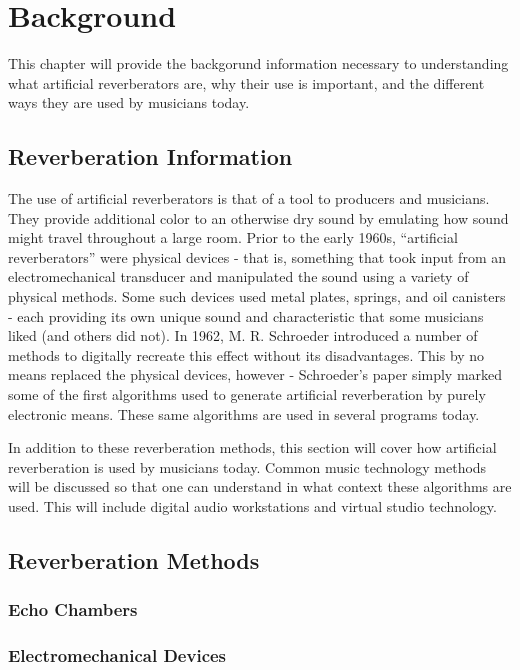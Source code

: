 \chapter{Background}
\hspace*{-0.155cm}This chapter will provide the backgorund information necessary to understanding what artificial reverberators are, why their use is important, and the different ways they are used by musicians today.

\section{Reverberation Information}
The use of artificial reverberators is that of a tool to producers and musicians. They provide additional color to an otherwise dry sound by emulating how sound might travel throughout a large room. Prior to the early 1960s, ``artificial reverberators'' were physical devices - that is, something that took input from an electromechanical transducer and manipulated the sound using a variety of physical methods. Some such devices used metal plates, springs, and oil canisters - each providing its own unique sound and characteristic that some musicians liked (and others did not). In 1962, M. R. Schroeder introduced a number of methods to digitally recreate this effect without its disadvantages. This by no means replaced the physical devices, however - Schroeder's paper simply marked some of the first algorithms used to generate artificial reverberation by purely electronic means. These same algorithms are used in several programs today.

In addition to these reverberation methods, this section will cover how artificial reverberation is used by musicians today. Common music technology methods will be discussed so that one can understand in what context these algorithms are used. This will include digital audio workstations and virtual studio technology.

\section{Reverberation Methods}

\subsection{Echo Chambers}

\subsection{Electromechanical Devices}
